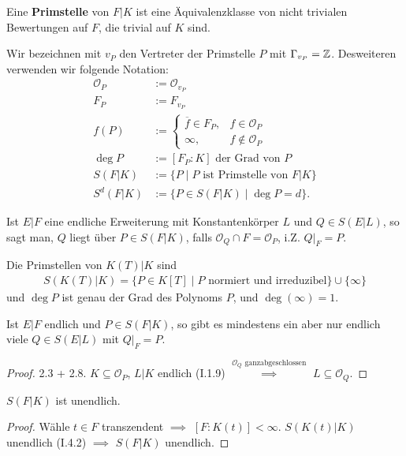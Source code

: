 \begin{definition}
    Eine \textbf{Primstelle} von $F|K$ ist eine Äquivalenzklasse von nicht trivialen Bewertungen auf $F$, die trivial auf $K$ sind.

    Wir bezeichnen mit $v_P$ den Vertreter der Primstelle $P$ mit $\Gamma_{v_P} = \mathbb{Z}$. 
    Desweiteren verwenden wir folgende Notation:
    \begin{align*}
        \mathcal{O}_P &:= \mathcal{O}_{v_P}\\
        F_P &:= F_{v_P}\\
        f(P) &:= \begin{cases}
            \overline{f} \in F_P, & f \in \mathcal{O}_P\\
            \infty, & f \notin \mathcal{O}_P
        \end{cases}\\
        \deg P &:= [F_P:K] \text{ der Grad von }P\\
        S(F|K) &:= \{P \mid P \text{ ist Primstelle von } F|K\}\\
        S^d(F|K) &:= \{P \in S(F|K) \mid \deg P = d\}.
    \end{align*}

    Ist $E|F$ eine endliche Erweiterung mit Konstantenkörper $L$ und $ Q \in S(E|L)$, so sagt man, $Q$ liegt über $P \in S(F|K)$, falls
    $\mathcal{O}_Q \cap F = \mathcal{O}_P$, i.Z. $Q|_F = P$.
\end{definition}

\begin{beispiel}
    Die Primstellen von $K(T)|K$ sind
    \begin{align*}
        S(K(T)|K) = \{P \in K[T] \mid P \text{ normiert und irreduzibel}\} \cup \{\infty\}
    \end{align*}
    und $\deg P$ ist genau der Grad des Polynoms $P$, und $\deg(\infty) = 1.$
\end{beispiel}

\begin{lemma}
    Ist $E|F$ endlich und $P \in S(F|K)$, so gibt es mindestens ein aber nur endlich viele $Q \in S(E|L)$ mit $Q|_F = P$.
\end{lemma}
\begin{proof}
    2.3 + 2.8. $K \subseteq \mathcal{O}_P$, $L|K$ endlich (I.1.9) $\stackrel{\mathcal{O}_Q\text{ ganzabgeschlossen}}{\implies}$
    $L \subseteq \mathcal{O}_Q$.
\end{proof}

\begin{satz}
    $S(F|K)$ ist unendlich.
\end{satz}
\begin{proof}
    Wähle $t \in F$ transzendent $\implies$ $[F:K(t)] < \infty$. 
    $S(K(t)|K)$ unendlich (I.4.2) $\implies$ $S(F|K)$ unendlich.
\end{proof}

